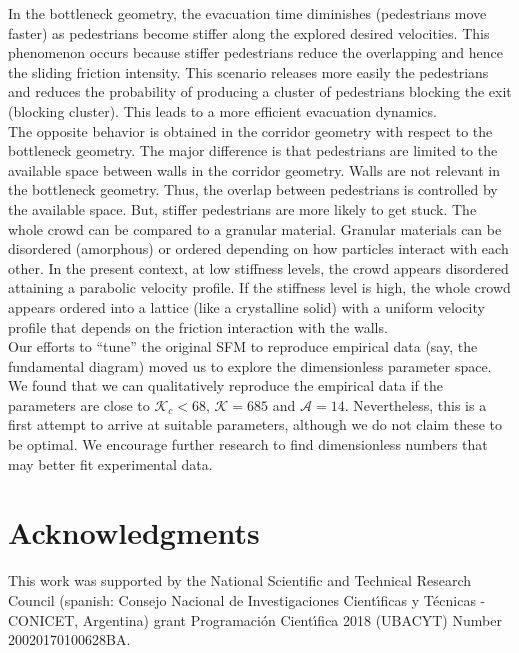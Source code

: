 \documentclass[preprint,12pt]{elsarticle}
\begin{document}
In the bottleneck geometry, the evacuation time diminishes (pedestrians move faster) as pedestrians become stiffer along the explored desired velocities. This phenomenon occurs because stiffer pedestrians reduce the overlapping and hence the sliding friction intensity. This scenario releases more easily the pedestrians and reduces the probability of producing a cluster of pedestrians blocking the exit (blocking cluster). This leads to a more efficient evacuation dynamics. \\

The opposite behavior is obtained in the corridor geometry with respect to the bottleneck geometry. The major difference is that pedestrians are limited to the available space between walls in the corridor geometry.  Walls are not relevant in the bottleneck geometry. Thus, the overlap between pedestrians is controlled by the available space. But, stiffer pedestrians are more likely to get stuck. The whole crowd can be compared to a granular material. Granular materials can be disordered (amorphous) or ordered depending on how particles interact with each other. In the present context, at low stiffness levels, the crowd appears disordered attaining a parabolic velocity profile.
If the stiffness level is high, the whole crowd appears ordered into a lattice (like a crystalline solid) with a uniform velocity profile that depends on the friction interaction with the walls.\\

Our efforts to ``tune'' the original SFM to reproduce empirical data (say, the fundamental diagram) moved us to explore the dimensionless parameter space.  We found that  we can qualitatively reproduce the empirical data if the parameters are close to $\mathcal{K}_c < 68$, $\mathcal{K} = 685$ and $\mathcal{A}=14$. Nevertheless, this is a first attempt to arrive at suitable parameters, although we do not claim these to be optimal. We encourage further research to find dimensionless numbers that may better fit experimental data.\\


\section*{Acknowledgments}
This work was supported by the National Scientific and Technical 
Research Council (spanish: Consejo Nacional de Investigaciones Cient\'\i ficas 
y T\'ecnicas - CONICET, Argentina) grant Programaci\'on Cient\'\i fica 2018 (UBACYT) Number 20020170100628BA.\\
\end{document}
